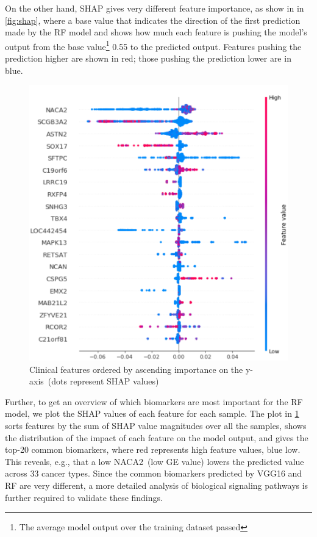 \hspace*{3.5mm} On the other hand, SHAP gives very different feature importance, as show in in \cref{fig:shap}, where a base value that indicates the direction of the first prediction made by the RF model and shows how much each feature is pushing the model's output from the base value\footnote{The average model output over the training dataset passed} 0.55 to the predicted output. Features pushing the prediction higher are shown in red; those pushing the prediction lower are in blue.

\begin{figure}[h]
\centering
	\includegraphics[scale=0.8]{images/fi.png}
	\caption{Clinical features ordered by ascending importance on the y-axis~(dots represent SHAP values)} 
	\label{fig:shap_FI}
	\vspace{-2mm}
\end{figure}

\hspace*{3.5mm} Further, to get an overview of which biomarkers are most important for the RF model, we plot the SHAP values of each feature for each sample. The plot in \cref{fig:shap_FI} sorts features by the sum of SHAP value magnitudes over all the samples, shows the distribution of the impact of each feature on the model output, and gives the top-20 common biomarkers, where red represents high feature values, blue low. This reveals, e.g., that a low NACA2~(low GE value) lowers the predicted value across 33 cancer types. Since the common biomarkers predicted by VGG16 and RF are very different, a more detailed analysis of biological signaling pathways is further required to validate these findings. 

